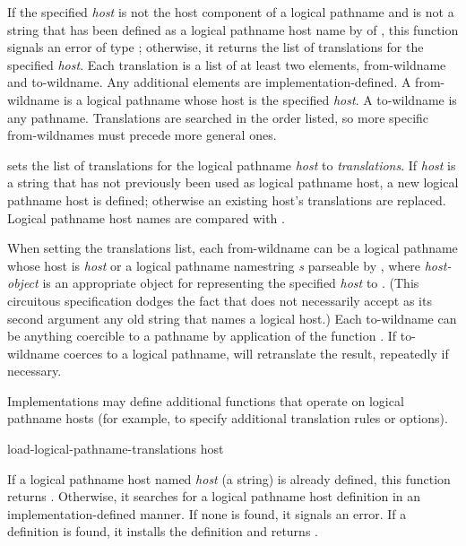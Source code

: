 \begin{newer}
\begin{defun}[Function]
    If the specified {\it host} is not the host component of a logical pathname and is not a
    string that has been defined as a logical pathname host name by  of
    , this function signals an error of type ;
    otherwise, it returns the list of translations for the specified {\it host}.  Each translation is
    a list of at least two elements, from-wildname and to-wildname.  Any
    additional elements are implementation-defined.  A from-wildname is a
    logical pathname whose host is the specified {\it host}.  A to-wildname is any pathname.
    Translations are searched in the order listed, so more specific
    from-wildnames must precede more general ones.

    sets the list of translations for the logical
    pathname {\it host} to {\it translations}.  If {\it host} is a string that has
    not previously been used as logical pathname host, a new logical
    pathname host is defined; otherwise an existing host's translations are
    replaced.  Logical pathname host names are compared with .

    When setting the translations list, each from-wildname can be a logical
    pathname whose host is {\it host} or a logical pathname namestring {\it s}
    parseable by , where {\it host-object}
    is an appropriate object for representing the specified {\it host} to
    .  (This circuitous specification dodges the fact
    that  does not necessarily accept as its second argument
    any old string that names a logical host.)
    Each to-wildname can be anything coercible to a pathname by application of
    the function .
    If to-wildname coerces to a logical pathname,
     will retranslate the result, repeatedly if
    necessary.

    Implementations may define additional functions that operate on
    logical pathname hosts (for example, to specify additional translation
    rules or options).
\end{defun}

\begin{defun}[Function]
load-logical-pathname-translations host

    If a logical pathname host named {\it host} (a string) is already defined,
    this function returns .  Otherwise, it searches for a logical pathname host definition
    in an implementation-defined manner.  If none is found, it signals an
    error.  If a definition is found, it installs the definition and returns .


\end{defun}
\end{newer}
